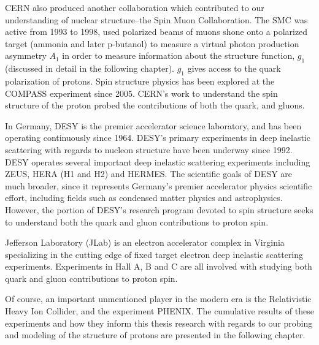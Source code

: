 CERN also produced another collaboration which contributed to our understanding
of nuclear structure--the Spin Muon Collaboration. The SMC was active from 1993
to 1998, used polarized beams of muons shone onto a polarized target (ammonia
and later p-butanol) to measure a virtual photon production asymmetry $A_1$ in
order to measure information about the structure function, $g_1$ (discussed in
detail in the following chapter). $g_1$ gives access to the quark polarization
of protons. Spin structure physics has been explored at the COMPASS experiment
since 2005. CERN's work to understand the spin structure of the proton probed
the contributions of both the quark, and gluons. 

In Germany, DESY is the premier accelerator science laboratory, and has been
operating continuously since 1964. DESY's primary experiments in deep inelastic
scattering with regards to nucleon structure have been underway since 1992. DESY
operates several important deep inelastic scattering experiments including ZEUS,
HERA (H1 and H2) and HERMES. The scientific goals of DESY are much broader,
since it represents Germany's premier accelerator physics scientific effort,
including fields such as condensed matter physics and astrophysics. However, the
portion of DESY's research program devoted to spin structure seeks to understand
both the quark and gluon contributions to proton spin.

Jefferson Laboratory (JLab) is an electron accelerator complex in Virginia
specializing in the cutting edge of fixed target electron deep inelastic
scattering experiments. Experiments in Hall A, B and C are all involved with
studying both quark and gluon contributions to proton spin.

Of course, an important unmentioned player in the modern era is the Relativistic
Heavy Ion Collider, and the experiment PHENIX. The cumulative results of these
experiments and how they inform this thesis research with regards to our probing
and modeling of the structure of protons  are presented in the following
chapter.
